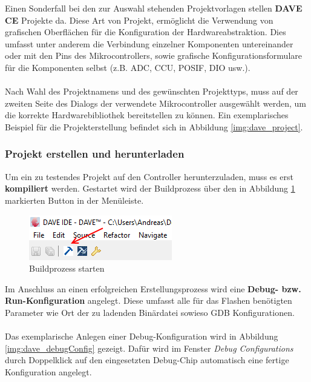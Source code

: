 Einen Sonderfall bei den zur Auswahl stehenden Projektvorlagen stellen \textbf{DAVE CE} Projekte da. Diese Art von Projekt, ermöglicht die Verwendung von grafischen Oberflächen für die Konfiguration der Hardwareabstraktion. Dies umfasst unter anderem die Verbindung einzelner Komponenten untereinander oder mit den Pins des Mikrocontrollers, sowie grafische Konfigurationsformulare für die Komponenten selbst (z.B. ADC, CCU, POSIF, DIO usw.). \\ \\
Nach Wahl des Projektnamens und des gewünschten Projekttyps, muss auf der zweiten Seite des Dialogs der verwendete Mikrocontroller ausgewählt werden, um die korrekte Hardwarebibliothek bereitstellen zu können. Ein exemplarisches Beispiel für die Projekterstellung befindet sich in Abbildung \ref{img:dave_project}. 

\subsubsection{Projekt erstellen und herunterladen}
Um ein zu testendes Projekt auf den Controller herunterzuladen, muss es erst \textbf{kompiliert} werden. Gestartet wird der Buildprozess über den in Abbildung \ref{img:dave_build} markierten Button in der Menüleiste. 

\begin{figure}[h]
\centering
\includegraphics{sensor/dave_build.PNG}
\caption{Buildprozess starten}
\label{img:dave_build}
\end{figure}

\noindent
Im Anschluss an einen erfolgreichen Erstellungsprozess wird eine \textbf{Debug- bzw. Run-Konfiguration} angelegt. Diese umfasst alle für das Flashen benötigten Parameter wie Ort der zu ladenden Binärdatei sowieso GDB Konfigurationen.\\

\noindent
{} \\

\noindent
Das exemplarische Anlegen einer Debug-Konfiguration wird in Abbildung \ref{img:dave_debugConfig} gezeigt. Dafür wird im Fenster \textit{Debug Configurations} durch Doppelklick auf den eingesetzten Debug-Chip automatisch eine fertige Konfiguration angelegt.

